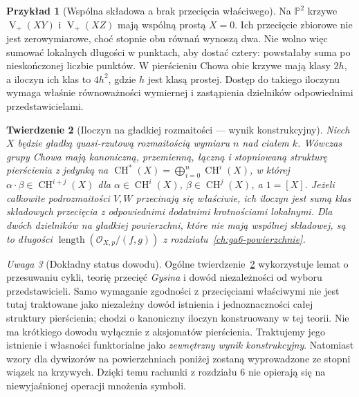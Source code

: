 \documentclass[11pt,a4paper,openany]{report}
\numberwithin{equation}{section}
\theoremstyle{plain}
\newtheorem{twierdzenie}{Twierdzenie}[section]
\theoremstyle{definition}
\newtheorem{przyklad}[twierdzenie]{Przykład}
\theoremstyle{remark}
\newtheorem{uwaga}[twierdzenie]{Uwaga}
\newcommand{\PP}{\mathbb P}
\newcommand{\V}{\operatorname V}
\begin{document}
\begin{przyklad}[Wspólna składowa a brak przecięcia właściwego]
Na $\PP^2$ krzywe $\V_+(XY)$ i $\V_+(XZ)$
mają wspólną prostą $X=0$. Ich przecięcie zbiorowe
nie jest zerowymiarowe, choć stopnie obu równań wynoszą dwa.
Nie wolno więc sumować lokalnych długości w punktach,
aby dostać cztery: powstałaby suma po nieskończonej liczbie
punktów. W pierścieniu Chowa obie krzywe mają klasy $2h$,
a iloczyn ich klas to $4h^2$, gdzie $h$ jest klasą prostej.
Dostęp do takiego iloczynu wymaga właśnie równoważności
wymiernej i zastąpienia dzielników odpowiednimi przedstawicielami.
\end{przyklad}

\begin{twierdzenie}[Iloczyn na gładkiej rozmaitości — wynik konstrukcyjny]
\label{tw:ga7-chow-ring}
Niech $X$ będzie gładką quasi-rzutową rozmaitością
wymiaru $n$ nad ciałem $k$. Wówczas grupy Chowa mają kanoniczną, przemienną,
łączną i stopniowaną strukturę pierścienia z jedynką na
$\operatorname{CH}^*(X)=\bigoplus_{i=0}^n\operatorname{CH}^i(X)$,
w której $\alpha\cdot\beta\in\operatorname{CH}^{i+j}(X)$
dla $\alpha\in\operatorname{CH}^i(X)$,
$\beta\in\operatorname{CH}^j(X)$, a $1=[X]$.
Jeżeli całkowite podrozmaitości $V,W$ przecinają się
właściwie, ich iloczyn jest sumą klas składowych
przecięcia z odpowiednimi dodatnimi krotnościami
lokalnymi. Dla dwóch dzielników na gładkiej powierzchni,
które nie mają wspólnej składowej, są to długości
$\operatorname{length}(\mathcal O_{X,p}/(f,g))$ z
rozdziału~\ref{ch:ga6-powierzchnie}.
\end{twierdzenie}

\begin{uwaga}[Dokładny status dowodu]
\label{uw:ga7-moving-lemma}
Ogólne twierdzenie~\ref{tw:ga7-chow-ring} wykorzystuje
lemat o przesuwaniu cykli, teorię przecięć \emph{Gysina}
i dowód niezależności od wyboru przedstawicieli.
Samo wymaganie zgodności z przecięciami właściwymi nie jest
tutaj traktowane jako niezależny dowód istnienia i jednoznaczności
całej struktury pierścienia; chodzi o kanoniczny iloczyn
konstruowany w tej teorii.
Nie ma krótkiego dowodu wyłącznie z aksjomatów pierścienia.
Traktujemy jego istnienie i własności funktorialne jako
\emph{zewnętrzny wynik konstrukcyjny}. Natomiast wzory dla
dywizorów na powierzchniach poniżej zostaną wyprowadzone
ze stopni wiązek na krzywych. Dzięki temu
rachunki z rozdziału 6 nie opierają się na niewyjaśnionej
operacji mnożenia symboli.
\end{uwaga}
\end{document}
